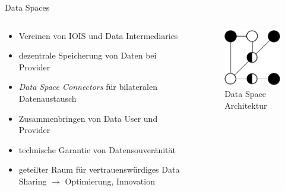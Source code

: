 \begin{frame}{Data Spaces \footnotesize\cite{mollerIndustrialDataEcosystems2024}}
    \begin{columns}
        \begin{column}{0.6\textwidth}
            \begin{itemize}
                \item Vereinen von IOIS und Data Intermediaries
                \item dezentrale Speicherung von Daten bei Provider
                \item \emph{Data Space Connectors} für bilateralen Datenaustausch %
                \item Zusammenbringen von Data User und Provider %
                \item technische Garantie von Datensouveränität %
                \item geteilter Raum für vertrauenswürdiges Data Sharing $\to$ Optimierung, Innovation
            \end{itemize}
        \end{column}

        \begin{column}{0.4\textwidth}
            \begin{figure}
                \includegraphics[height=0.5\textheight]{./assets/data_space_architecture.drawio.pdf}
                \caption{Data Space Architektur}
            \end{figure}
        \end{column}
    \end{columns}
\end{frame}


